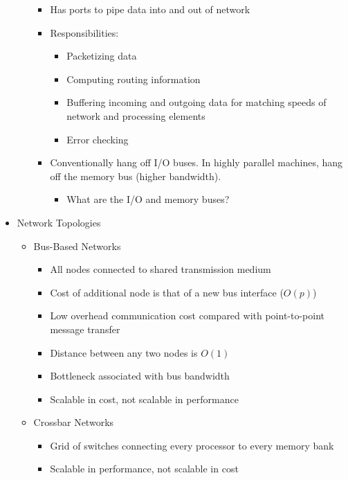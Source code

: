 \documentclass[a4paper]{article}
\begin{document}
\begin{itemize}
\begin{itemize}
\begin{itemize}
          \item Has ports to pipe data into and out of network
          \item Responsibilities:
            \begin{itemize}
              \item Packetizing data
              \item Computing routing information
              \item Buffering incoming and outgoing data for matching speeds of network and processing elements
              \item Error checking
            \end{itemize}
          \item Conventionally hang off I/O buses. In highly parallel machines, hang off the memory bus (higher bandwidth).
            \begin{itemize}
              \item \color{red} What are the I/O and memory buses?
            \end{itemize}
        \end{itemize}
    \end{itemize}
  \item Network Topologies
    \begin{itemize}
      \item Bus-Based Networks
        \begin{itemize}
          \item All nodes connected to shared transmission medium
          \item Cost of additional node is that of a new bus interface ($O(p)$)
          \item Low overhead communication cost compared with point-to-point message transfer
          \item Distance between any two nodes is $O(1)$
          \item Bottleneck associated with bus bandwidth
          \item Scalable in cost, not scalable in performance
        \end{itemize}
      \item Crossbar Networks
        \begin{itemize}
          \item Grid of switches connecting every processor to every memory bank
          \item Scalable in performance, not scalable in cost
        \end{itemize}

\end{itemize}
\end{itemize}
\end{document}
